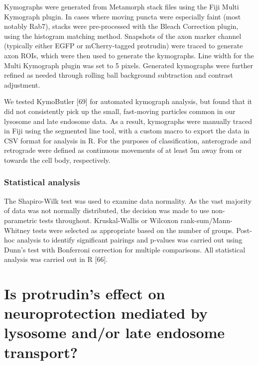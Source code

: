 \documentclass[
  12pt,
  a4paper,
]{book}
\renewcommand{\chaptermark}[1]{\markboth{#1}{}}
\begin{document}
Kymographs were generated from Metamorph stack files using the Fiji Multi Kymograph plugin. In cases where moving puncta were especially faint (most notably Rab7), stacks were pre-processed with the Bleach Correction plugin, using the histogram matching method. Snapshots of the axon marker channel (typically either EGFP or mCherry-tagged protrudin) were traced to generate axon ROIs, which were then used to generate the kymographs. Line width for the Multi Kymograph plugin was set to 5 pixels. Generated kymographs were further refined as needed through rolling ball background subtraction and contrast adjustment.

We tested KymoButler {[}69{]} for automated kymograph analysis, but found that it did not consistently pick up the small, fast-moving particles common in our lysosome and late endosome data. As a result, kymographs were manually traced in Fiji using the segmented line tool, with a custom macro to export the data in CSV format for analysis in R. For the purposes of classification, anterograde and retrograde were defined as continuous movements of at
least 5\textmu{}m away from or towards the cell body, respectively.

\hypertarget{statistical-analysis}{%
\subsection{Statistical analysis}\label{statistical-analysis}}

The Shapiro-Wilk test was used to examine data normality. As the vast majority of data was not normally distributed, the decision was made to use non-parametric tests throughout. Kruskal-Wallis or Wilcoxon rank-sum/Mann-Whitney tests were selected as appropriate based on the number of groups. Post-hoc analysis to identify significant pairings and p-values was carried out using Dunn's test with Bonferroni correction for multiple comparisons. All statistical analysis was carried out in R {[}66{]}.

\hypertarget{is-protrudins-effect-on-neuroprotection-mediated-by-lysosome-andor-late-endosome-transport}{%
\chapter{Is protrudin's effect on neuroprotection mediated by lysosome and/or late endosome transport?}\label{is-protrudins-effect-on-neuroprotection-mediated-by-lysosome-andor-late-endosome-transport}}

\chaptermark{Lysosome and late endosome transport}
\end{document}
